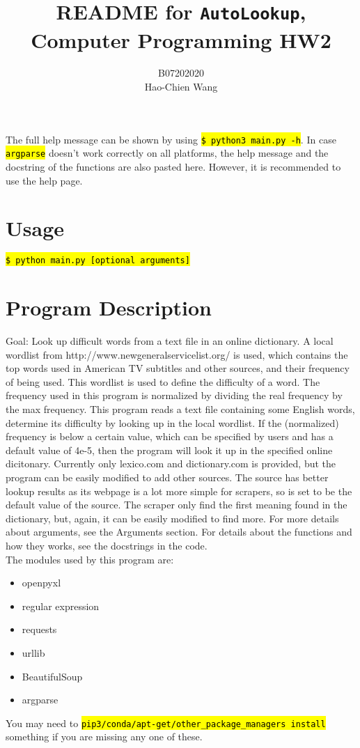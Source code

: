 \documentclass[12pt]{article}
\title{README for \texttt{AutoLookup}, Computer Programming HW2}
\author{B07202020\\Hao-Chien Wang}
\newcommand{\hltexttt}[1]{\texttt{\hl{#1}}}
\begin{document}
\maketitle
The full help message can be shown by using \hltexttt{\$ python3 main.py -h}. In case \hltexttt{argparse} doesn't work correctly on all platforms, the help message and the docstring of the functions are also pasted here. However, it is 
recommended to use the help page. 

\section{Usage}%
\label{sec:usage}
\hltexttt{\$ python main.py [optional arguments]}

\section{Program Description}%
\label{sec:program_description}

Goal: Look up difficult words from a text file in an online dictionary. A local wordlist from
http://www.newgeneralservicelist.org/ is used, which contains the top words used in American TV 
subtitles and other sources, and their frequency of being used. This wordlist is used to define 
the difficulty of a word. The frequency used in this program is normalized by dividing the real
frequency by the max frequency. This program reads a text file containing some English words, 
determine its difficulty by looking up in the local wordlist. If the (normalized) frequency is 
below a certain value, which can be specified by users and has a default value of 4e-5, then the
program will look it up in the specified online dicitonary. Currently only lexico.com and 
dictionary.com is provided, but the program can be easily modified to add other sources. The 
source has better lookup results as its webpage is a lot more simple for scrapers, so is set 
to be the default value of the source. The scraper only find the first meaning found in the  
dictionary, but, again, it can be easily modified to find more. For more details about arguments, 
see the Arguments section. For details about the functions and how they works, see the docstrings 
in the code. \\
The modules used by this program are: 
\begin{itemize}
	\item openpyxl
	\item regular expression
	\item requests
	\item urllib
	\item BeautifulSoup
	\item argparse
\end{itemize}
You may need to \hltexttt{pip3/conda/apt-get/other\_package\_managers install} something if you are missing 
any one of these.\\
\end{document}
